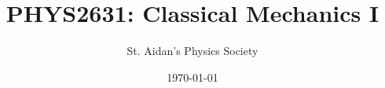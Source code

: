 \documentclass[12pt,%
               a4paper]{physics_notes}
\begin{document}
\title{PHYS2631: Classical Mechanics I}
\author{St. Aidan's Physics Society}
\date{\today}
\maketitle
\end{document}

